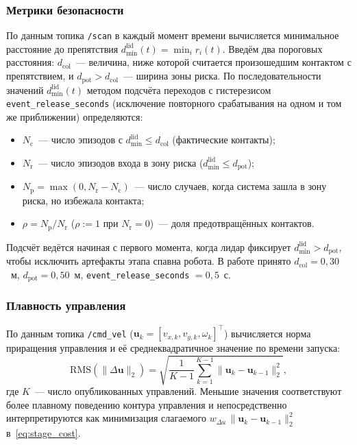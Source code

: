\subsubsection{Метрики безопасности}

По данным топика \texttt{/scan} в каждый момент времени вычисляется
минимальное расстояние до препятствия
$d^{\text{lid}}_{\min}(t) = \min_i r_i(t)$. Введём два пороговых
расстояния: $d_{\text{col}}$~--- величина, ниже которой считается
произошедшим контактом с препятствием, и
$d_{\text{pot}} > d_{\text{col}}$~--- ширина зоны риска. По
последовательности значений $d^{\text{lid}}_{\min}(t)$ методом
подсчёта переходов с гистерезисом
\texttt{event\_release\_seconds} (исключение повторного срабатывания
на одном и том же приближении) определяются:
\begin{itemize}
    \item $N_{\text{c}}$~--- число эпизодов с $d^{\text{lid}}_{\min} \le d_{\text{col}}$
          (фактические контакты);
    \item $N_{\text{r}}$~--- число эпизодов входа в зону риска
          ($d^{\text{lid}}_{\min} \le d_{\text{pot}}$);
    \item $N_{\text{p}} = \max(0, N_{\text{r}} - N_{\text{c}})$~---
          число случаев, когда система зашла в зону риска, но
          избежала контакта;
    \item $\rho = N_{\text{p}}/N_{\text{r}}$ ($\rho := 1$ при
          $N_{\text{r}}=0$)~--- доля предотвращённых контактов.
\end{itemize}
Подсчёт ведётся начиная с первого момента, когда лидар фиксирует
$d^{\text{lid}}_{\min} > d_{\text{pot}}$, чтобы исключить артефакты
этапа спавна робота. В работе принято
$d_{\text{col}} = 0{,}30$~м,
$d_{\text{pot}} = 0{,}50$~м,
\texttt{event\_release\_seconds} $= 0{,}5$~с.

\subsubsection{Плавность управления}

По данным топика \texttt{/cmd\_vel} ($\mathbf{u}_k = [v_{x,k}, v_{y,k}, \omega_k]^{\top}$)
вычисляется норма приращения управления и её среднеквадратичное
значение по времени запуска:
\begin{equation}
\mathrm{RMS}(\|\Delta \mathbf{u}\|_2) =
\sqrt{\frac{1}{K-1}\sum_{k=1}^{K-1} \|\mathbf{u}_k - \mathbf{u}_{k-1}\|_2^{2}},
\label{eq:metric_smoothness}
\end{equation}
где $K$~--- число опубликованных управлений. Меньшие значения
соответствуют более плавному поведению контура управления и
непосредственно интерпретируются как минимизация слагаемого
$w_{\Delta u}\,\|\mathbf{u}_k - \mathbf{u}_{k-1}\|_2^{2}$ в~\eqref{eq:stage_cost}.

